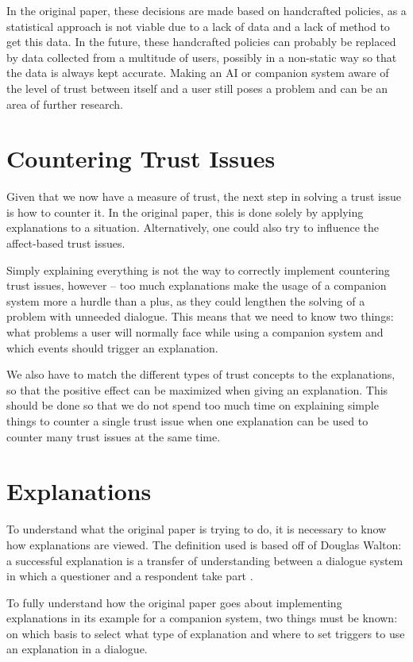 \documentclass[a4paper]{article}
\begin{document}
In the original paper, these decisions are made based on handcrafted policies, as a statistical approach is not viable due to a lack of data and a lack of method to get this data. In the future, these handcrafted policies can probably be replaced by data collected from a multitude of users, possibly in a non-static way so that the data is always kept accurate. Making an AI or companion system aware of the level of trust between itself and a user still poses a problem and can be an area of further research.

\section{Countering Trust Issues}

Given that we now have a measure of trust, the next step in solving a trust issue is how to counter it. In the original paper, this is done solely by applying explanations to a situation. Alternatively, one could also try to influence the affect-based trust issues.

Simply explaining everything is not the way to correctly implement countering trust issues, however – too much explanations make the usage of a companion system more a hurdle than a plus, as they could lengthen the solving of a problem with unneeded dialogue. This means that we need to know two things: what problems a user will normally face while using a companion system and which events should trigger an explanation.

We also have to match the different types of trust concepts to the explanations, so that the positive effect can be maximized when giving an explanation. This should be done so that we do not spend too much time on explaining simple things to counter a single trust issue when one explanation can be used to counter many trust issues at the same time.

\section{Explanations}

To understand what the original paper is trying to do, it is necessary to know how explanations are viewed. The definition used is based off of Douglas Walton: a successful explanation is a transfer of understanding between a dialogue system in which a questioner and a respondent take part \cite{walton2004new}.

To fully understand how the original paper goes about implementing explanations in its example for a companion system, two things must be known: on which basis to select what type of explanation and where to set triggers to use an explanation in a dialogue.
\end{document}
